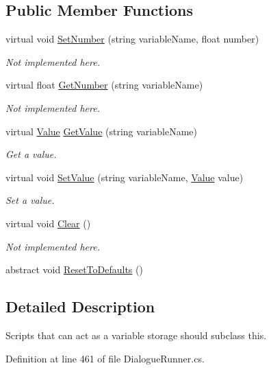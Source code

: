 \subsection*{Public Member Functions}
\begin{DoxyCompactItemize}
\item 
virtual void \hyperlink{a00191_ac0d2f2e081944ad197992a26ad1a833c}{Set\-Number} (string variable\-Name, float number)
\begin{DoxyCompactList}\small\item\em Not implemented here. \end{DoxyCompactList}\item 
virtual float \hyperlink{a00191_add85a45dd65a5d4bd41c9d5ce5f77d19}{Get\-Number} (string variable\-Name)
\begin{DoxyCompactList}\small\item\em Not implemented here. \end{DoxyCompactList}\item 
virtual \hyperlink{a00187}{Value} \hyperlink{a00191_ac6ebafcbebc2b2d71eba8562490a2f1e}{Get\-Value} (string variable\-Name)
\begin{DoxyCompactList}\small\item\em Get a value. \end{DoxyCompactList}\item 
virtual void \hyperlink{a00191_a25f979b062d63c9e886fe7070ce4561b}{Set\-Value} (string variable\-Name, \hyperlink{a00187}{Value} value)
\begin{DoxyCompactList}\small\item\em Set a value. \end{DoxyCompactList}\item 
virtual void \hyperlink{a00191_a587fe10b367ace190e10f3bcb590a53c}{Clear} ()
\begin{DoxyCompactList}\small\item\em Not implemented here. \end{DoxyCompactList}\item 
abstract void \hyperlink{a00191_a33fcbff56561e53e0a70b59c56f0c3af}{Reset\-To\-Defaults} ()
\end{DoxyCompactItemize}


\subsection{Detailed Description}
Scripts that can act as a variable storage should subclass this. 

Definition at line 461 of file Dialogue\-Runner.\-cs.



